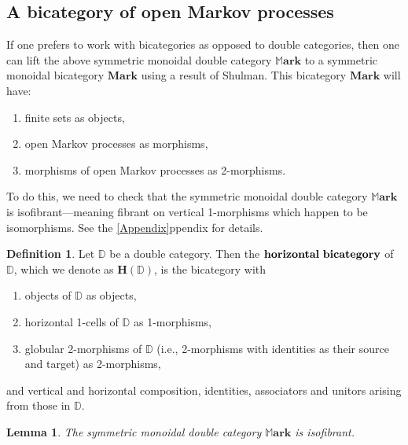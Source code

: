 \documentclass[oneside,final]{ucr}
\newtheorem{lemma}[theorem]{Lemma}
\theoremstyle{definition}
\newtheorem{definition}[theorem]{Definition}
\newcommand{\define}[1]{{\bf \boldmath #1}}
\newcommand{\lD}{\mathbb{D}}
\newcommand{\MMark}{\mathbb{M}\mathbf{ark}}
\begin{document}
{\subsection{A bicategory of open Markov processes}
If one prefers to work with bicategories as opposed to double categories, then one can lift the above symmetric monoidal double category $\MMark$ to a symmetric monoidal bicategory $\mathbf{Mark}$ using a result of Shulman. This bicategory $\mathbf{Mark}$ will have:
\begin{enumerate}
\item finite sets as objects,
\item open Markov processes as morphisms,
\item morphisms of open Markov processes as 2-morphisms.
\end{enumerate}
To do this, we need to check that the symmetric monoidal double category $\MMark$ is isofibrant---meaning fibrant on vertical 1-morphisms which happen to be isomorphisms. See the \ref{Appendix}ppendix for details.

\begin{definition}
Let $\lD$ be a double category. Then the $\define{horizontal} \textnormal{ } \define{bicategory}$ of $\lD$, which we denote as $\mathbf{H}(\lD)$, is the bicategory with
\begin{enumerate}
\item objects of $\lD$ as objects,
\item  horizontal 1-cells of $\lD$ as 1-morphisms, 
\item globular 2-morphisms of $\lD$ (i.e., 2-morphisms with identities as their source and target)  as 2-morphisms,
\end{enumerate}
and vertical and horizontal composition, identities, associators and unitors arising from those in 
$\lD$.
\end{definition}



\begin{lemma}
\label{lem:isofibrant}
The symmetric monoidal double category $\MMark$ is isofibrant.
\end{lemma}

}
\end{document}
